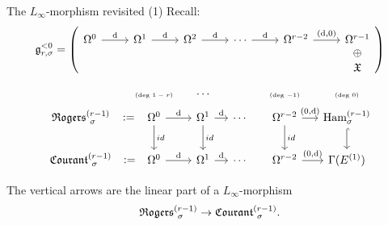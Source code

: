 \documentclass[beamer,10pt]{standalone}
\begin{document}
\begin{frame}{The \cite{Miti2024} $L_\infty$-morphism revisited (1)}
	Recall:
	\begin{displaymath}
		\g_{r,\sigma}^{<0} = \left(
		\begin{tikzcd}[ampersand replacement=\&]
			\Omega^0 \ar[r,"\d"]\&
			\Omega^1 \ar[r,"\d"]\&
			\Omega^2 \ar[r,"\d"]\&
			\cdots \ar[r,"\d"]\&
			\Omega^{r-2} \ar[r,"{(\d,0)}"]\&
			\Omega^{r-1}\ar[d,phantom,"\oplus"]\\[-.7em]
			\&\&\&\&\&\X
 		\end{tikzcd}
		\right)
	\end{displaymath}
	\vfill\pause

	\begin{displaymath}
		\begin{tikzcd}[ampersand replacement=\&,column sep = small]
			\& \text{\tiny (deg $1-r$)} \& \cdots \& \&\text{\tiny (deg $-1$)} \& \text{\tiny (deg $0$)} \\[-1.5em]
			\Rogers[\sigma]{r-1}   \ar[r,phantom,":="]
			\&
			\Omega^0 \ar[r,"{\d}"] \ar[d,"id"]
			\&
			\Omega^1 \ar[r,"{\d}"] \ar[d,"id"]
			\&
			\cdots
			\&
			\Omega^{r-2} \ar[r,"{(0,\d)}"] \ar[d,"id"]
			\& \Ham_{\sigma}^{(r-1)} \ar[d,hook]
			\\
			\Courant[\sigma]{r-1} \ar[r,phantom,":="]
			\&
			\Omega^0 \ar[r,"{\d}"]
			\&
			\Omega^1 \ar[r,"{\d}"] 
			\&
			\cdots
			\&
			\Omega^{r-2} \ar[r,"{(0,\d)}"]
			\& \Gamma(E^{(1)})
		\end{tikzcd}
	\end{displaymath}
	\vfill\pause

	\begin{thmblock}[{[M.-Zambon 2024]}]
		The vertical arrows are the linear part of a $L_\infty$-morphism $$\Rogers[\sigma]{r-1} \to \Courant[\sigma]{r-1}.$$
	\end{thmblock}
	\vfill
\end{frame}
\end{document}
